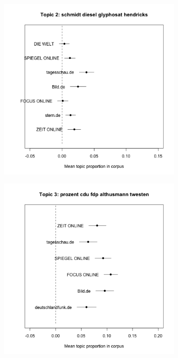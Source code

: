 \documentclass[12pt,a4paper,notitlepage]{article}
\begin{document}
\begin{figure}[H]
\begin{center}
\begin{subfigure}[normla]{0.2\textwidth}
			\includegraphics[width=\textwidth]{../figs/estimate_effect2.png}
		\end{subfigure}
				\begin{subfigure}[normla]{0.2\textwidth}
			\includegraphics[width=\textwidth]{../figs/estimate_effect3.png}

\end{subfigure}
\end{center}
\end{figure}
\end{document}
